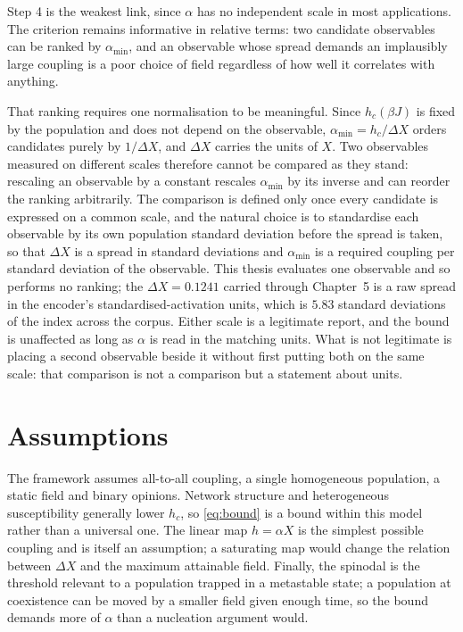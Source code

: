 Step 4 is the weakest link, since $\alpha$ has no independent scale in most applications. The
criterion remains informative in relative terms: two candidate observables can be ranked by
$\alpha_{\min}$, and an observable whose spread demands an implausibly large coupling is a poor
choice of field regardless of how well it correlates with anything.

That ranking requires one normalisation to be meaningful. Since $h_c(\beta J)$ is fixed by the
population and does not depend on the observable, $\alpha_{\min} = h_c/\Delta X$ orders
candidates purely by $1/\Delta X$, and $\Delta X$ carries the units of $X$. Two observables
measured on different scales therefore cannot be compared as they stand: rescaling an
observable by a constant rescales $\alpha_{\min}$ by its inverse and can reorder the ranking
arbitrarily. The comparison is defined only once every candidate is expressed on a common
scale, and the natural choice is to standardise each observable by its own population standard
deviation before the spread is taken, so that $\Delta X$ is a spread in standard deviations and
$\alpha_{\min}$ is a required coupling per standard deviation of the observable. This thesis
evaluates one observable and so performs no ranking; the $\Delta X = 0.1241$ carried through
Chapter~5 is a raw spread in the encoder's standardised-activation units, which is $5.83$
standard deviations of the index across the corpus. Either scale is a legitimate report, and
the bound is unaffected as long as $\alpha$ is read in the matching units. What is not
legitimate is placing a second observable beside it without first putting both on the same
scale: that comparison is not a comparison but a statement about units.

\section{Assumptions}

The framework assumes all-to-all coupling, a single homogeneous population, a static field and
binary opinions. Network structure and heterogeneous susceptibility generally lower $h_c$, so
\eqref{eq:bound} is a bound within this model rather than a universal one. The linear map
$h = \alpha X$ is the simplest possible coupling and is itself an assumption; a saturating map
would change the relation between $\Delta X$ and the maximum attainable field. Finally, the
spinodal is the threshold relevant to a population trapped in a metastable state; a population
at coexistence can be moved by a smaller field given enough time, so the bound demands more of
$\alpha$ than a nucleation argument would.

